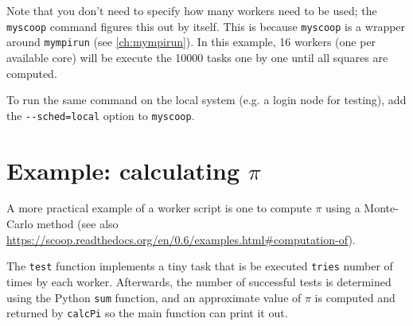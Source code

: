 
Note that you don't need to specify how many workers need to be used; the \lstinline|myscoop|
command figures this out by itself. This is because \lstinline|myscoop| is a wrapper around
\lstinline|mympirun| (see \autoref{ch:mympirun}).
In this example, 16 workers (one per available core) will be
execute the 10000 tasks one by one until all squares are computed.

To run the same command on the local system (e.g. a login node for testing), add
the \lstinline|--sched=local| option to \lstinline|myscoop|.

\section{Example: calculating $\pi$}

A more practical example of a worker script is one to compute $\pi$ using a
Monte-Carlo method (see also \url{https://scoop.readthedocs.org/en/0.6/examples.html#computation-of}).

The \lstinline|test| function implements a tiny task that is be executed \lstinline|tries| number of times by
each worker.
Afterwards, the number of successful tests is determined using the Python \lstinline|sum| function,
and an approximate value of $\pi$ is computed and returned by \lstinline|calcPi| so the main function can print it out.


